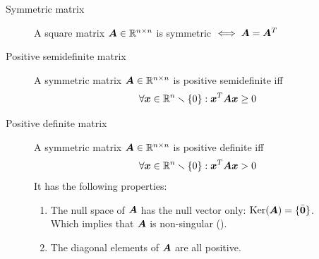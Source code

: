 \begin{description}
    \item[Symmetric matrix] 
        A square matrix ${\bm{A}} \in \mathbb{R}^{n \times n}$ is symmetric $\iff {\bm{A}} = {\bm{A}}^T$
    
    \item[Positive semidefinite matrix] 
        A symmetric matrix ${\bm{A}} \in \mathbb{R}^{n \times n}$ is positive semidefinite iff
        \begin{equation*}
            \forall {\bm{x}} \in \mathbb{R}^n \smallsetminus \{0\}: {\bm{x}}^T {\bm{A}} {\bm{x}} \geq 0
        \end{equation*}

    \item[Positive definite matrix] 
        A symmetric matrix ${\bm{A}} \in \mathbb{R}^{n \times n}$ is positive definite iff
        \begin{equation*}
            \forall {\bm{x}} \in \mathbb{R}^n \smallsetminus \{0\}: {\bm{x}}^T {\bm{A}} {\bm{x}} > 0
        \end{equation*}
        It has the following properties:
        \begin{enumerate}
            \item The null space of ${\bm{A}}$ has the null vector only: $\text{Ker}({\bm{A}}) = \{ \bar{{\bm{0}}} \}$. \\
                Which implies that ${\bm{A}}$ is non-singular ().
            \item The diagonal elements of ${\bm{A}}$ are all positive.
        \end{enumerate}
\end{description}



